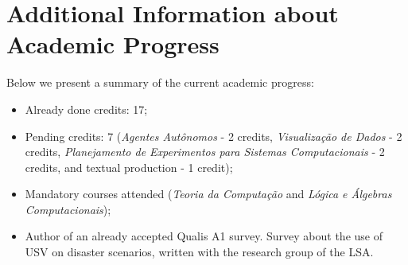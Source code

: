     \section{Additional Information about Academic Progress }

    Below we present a summary of the current academic progress: 

    \begin{itemize}
        \item Already done credits: 17;
        \item Pending credits: 7 (\textit{Agentes Autônomos} - 2 credits, \textit{Visualização de Dados} - 2 credits, \textit{Planejamento de Experimentos para Sistemas Computacionais} - 2 credits, and textual production - 1 credit);
        \item Mandatory courses attended (\textit{Teoria da Computação} and \textit{Lógica e Álgebras Computacionais});
        \item Author of an already accepted Qualis A1 survey. Survey about the use of \ac{USV} on disaster scenarios, written with the research group of the \ac{LSA}.
        
    \end{itemize}